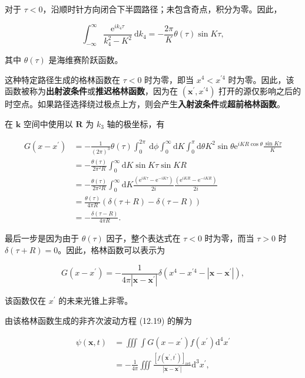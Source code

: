 对于
\(\tau<0\)，沿顺时针方向闭合下半圆路径；未包含奇点，积分为零。因此，

\[
\int_{-\infty}^{\infty} \frac{\mathrm{e}^{i k_{4} \tau}}{k_{4}^{2}-K^{2}} \mathrm{~d} k_{4}=-\frac{2 \pi}{K} \theta(\tau) \sin K \tau,
\]

其中 \(\theta(\tau)\) 是海维赛阶跃函数。

这种特定路径生成的格林函数在 \(\tau<0\) 时为零，即当
\(x^{4}<x^{\prime 4}\)
时为零。因此，该函数被称为\textbf{出射波条件}或\textbf{推迟格林函数}，因为在
\(\left(\mathbf{x}^{\prime}, x^{\prime 4}\right)\)
打开的源仅影响之后的时空点。如果路径选择绕过极点上方，则会产生\textbf{入射波条件}或\textbf{超前格林函数}。

在 \(\mathbf{k}\) 空间中使用以 \(\mathbf{R}\) 为 \(k_{3}\)
轴的极坐标，有

\[
\begin{aligned}
G\left(x-x^{\prime}\right) & =-\frac{1}{(2 \pi)^{3}} \theta(\tau) \int_{0}^{2 \pi} \mathrm{~d} \phi \int_{0}^{\infty} \mathrm{d} K \int_{0}^{\pi} \mathrm{d} \theta K^{2} \sin \theta \mathrm{e}^{i K R \cos \theta} \frac{\sin K \tau}{K} \\
& =-\frac{\theta(\tau)}{2 \pi^{2} R} \int_{0}^{\infty} \mathrm{d} K \sin K \tau \sin K R \\
& =-\frac{\theta(\tau)}{2 \pi^{2} R} \int_{0}^{\infty} \mathrm{d} K \frac{\left(\mathrm{e}^{i K \tau}-\mathrm{e}^{-i K \tau}\right)}{2 i} \frac{\left(\mathrm{e}^{i K R}-\mathrm{e}^{-i K R}\right)}{2 i} \\
& =\frac{\theta(\tau)}{4 \pi R}(\delta(\tau+R)-\delta(\tau-R)) \\
& =-\frac{\delta(\tau-R)}{4 \pi R}.
\end{aligned}
\]

最后一步是因为由于 \(\theta(\tau)\) 因子，整个表达式在 \(\tau<0\)
时为零，而当 \(\tau>0\) 时
\(\delta(\tau+R)=0\)。因此，格林函数可以表示为

\[
G\left(x-x^{\prime}\right)=-\frac{1}{4 \pi\left|\mathbf{x}-\mathbf{x}^{\prime}\right|} \delta\left(x^{4}-x^{\prime 4}-\left|\mathbf{x}-\mathbf{x}^{\prime}\right|\right),
\]

该函数仅在 \(x^{\prime}\) 的未来光锥上非零。

由该格林函数生成的非齐次波动方程 (12.19) 的解为

\[
\begin{aligned}
\psi(\mathbf{x}, t) & =\iiint \int G\left(x-x^{\prime}\right) f\left(x^{\prime}\right) \mathrm{d}^{4} x^{\prime} \\
& =-\frac{1}{4 \pi} \iiint \frac{\left[f\left(\mathbf{x}^{\prime}, t^{\prime}\right)\right]_{\mathrm{ret}}}{\left|\mathbf{x}-\mathbf{x}^{\prime}\right|} \mathrm{d}^{3} x^{\prime},
\end{aligned}
\]

